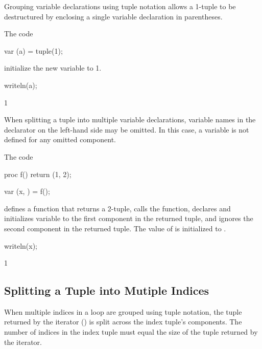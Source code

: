 Grouping variable declarations using tuple notation allows a 1-tuple
to be destructured by enclosing a single variable declaration in
parentheses.
\begin{example}
\begin{chapelpre}
\end{chapelpre}
The code
\begin{chapel}
var (a) = tuple(1);
\end{chapel}
initialize the new variable  to 1.
\begin{chapelpost}
writeln(a);
\end{chapelpost}
\begin{chapeloutput}
1
\end{chapeloutput}
\end{example}

When splitting a tuple into multiple variable declarations, variable
names in the declarator on the left-hand side may be omitted.  In
this case, a variable is not defined for any omitted component.

\begin{example}
\begin{chapelpre}
\end{chapelpre}
The code
\begin{chapel}
proc f()
  return (1, 2);

var (x, ) = f();
\end{chapel}
defines a function that returns a 2-tuple, calls the function,
declares and initializes variable  to the first component in
the returned tuple, and ignores the second component in the returned
tuple.  The value of  is initialized to .
\begin{chapelpost}
writeln(x);
\end{chapelpost}
\begin{chapeloutput}
1
\end{chapeloutput}
\end{example}

\subsection{Splitting a Tuple into Mutiple Indices}
\label{Indices_in_a_Tuple}

When multiple indices in a loop are grouped using tuple notation, the tuple
returned by the iterator () is split across the index tuple's components.  The
number of indices in the index tuple must equal the size of the tuple
returned by the iterator.

